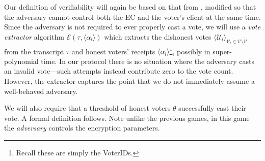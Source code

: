 \documentclass[12pt,a4paper]{article}
\theoremstyle{definition}
\begin{document}
Our definition of verifiability will again be based on that from \cite{kiayias2015end}, modified so that the adversary cannot control both the EC and the voter's client at the same time. Since the adversary is not required to ever properly cast a vote, we will use a \textit{vote extractor} algorithm $\mathcal{E}\left(\tau, \langle \alpha_l \rangle\right)$ which extracts the dishonest votes $\langle \mathcal{U}_l \rangle_{\mathcal{V}_l\in\mathcal{V}\setminus\tilde{\mathcal{V}}}$ from the transcript $\tau$ and honest voters' receipts $\langle \alpha_l \rangle$\footnote{Recall these are simply the VoterIDs.}, possibly in super-polynomial time. In our protocol there is no situation where the adversary casts an invalid vote---such attempts instead contribute zero to the vote count. However, the extractor captures the point that we do not immediately assume a well-behaved adversary.

We will also require that a threshold of honest voters $\theta$ successfully cast their vote. A formal definition follows. Note unlike the previous games, in this game the \textit{adversary} controls the encryption parameters.
\end{document}
